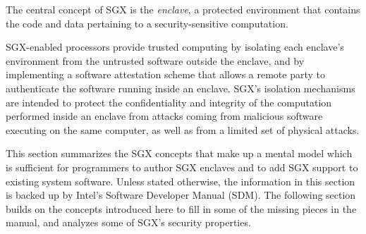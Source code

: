 \label{sec:sgx_model}

The central concept of SGX is the \textit{enclave}, a protected environment
that contains the code and data pertaining to a security-sensitive computation.

SGX-enabled processors provide trusted computing by isolating each enclave's
environment from the untrusted software outside the enclave, and by
implementing a software attestation scheme that allows a remote party to
authenticate the software running inside an enclave. SGX's isolation mechanisms
are intended to protect the confidentiality and integrity of the computation
performed inside an enclave from attacks coming from malicious software
executing on the same computer, as well as from a limited set of physical
attacks.

This section summarizes the SGX concepts that make up a mental model which is
sufficient for programmers to author SGX enclaves and to add SGX support to
existing system software. Unless stated otherwise, the information in this
section is backed up by Intel's Software Developer Manual (SDM). The following
section builds on the concepts introduced here to fill in some of the missing
pieces in the manual, and analyzes some of SGX's security properties.











